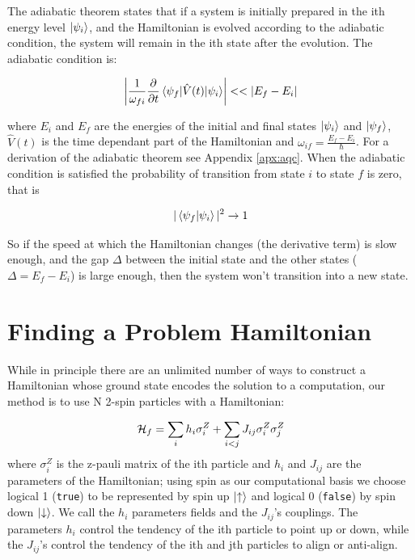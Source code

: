 The adiabatic theorem states that if a system is initially prepared in the ith energy level $\mathinner{|{\psi_i}\rangle}$, and the Hamiltonian is evolved according to the adiabatic condition, the system will remain in the ith state after the evolution.  The adiabatic condition is:

\begin{equation}
	\left | \frac{1}{\omega_{fi}}\frac{\partial}{\partial t} \mathinner{\langle{\psi_f | \hat{V}(t) | \psi_i}\rangle} \right | << |E_f - E_i|
\end{equation}

where $E_i$ and $E_f$ are the energies of the initial and final states $\mathinner{|{\psi_i}\rangle}$ and $\mathinner{|{\psi_f}\rangle}$, $\hat{V}(t)$ is the time dependant part of the Hamiltonian and $\omega_{if} = \frac{E_f - E_i}{\hbar}$.  For a derivation of the adiabatic theorem see Appendix \ref{apx:aqc}.\cite{zettili}  When the adiabatic condition is satisfied the probability of transition from state $i$ to state $f$ is zero, that is

\begin{equation}
	|\mathinner{\langle{\psi_f|\psi_i}\rangle}|^2 \rightarrow 1
\end{equation}

So if the speed at which the Hamiltonian changes (the derivative term) is slow enough, and the gap $\Delta$ between the initial state and the other states ($\Delta = E_f - E_i$) is large enough, then the system won't transition into a new state.  

\section{Finding a Problem Hamiltonian}
\label{sec:prob_ham}
While in principle there are an unlimited number of ways to construct a Hamiltonian whose ground state encodes the solution to a computation, our method is to use N 2-spin particles with a Hamiltonian:

\begin{equation}
	\label{eq:ham}
	\mathcal{H}_f = \sum_i h_i \sigma_i^Z + \sum_{i < j} J_{ij} \sigma_i^Z\sigma_j^Z 
\end{equation}
where $\sigma_i^Z$ is the z-pauli matrix of the ith particle and $h_i$ and $J_{ij}$ are the parameters of the Hamiltonian; using spin as our computational basis we choose logical 1 (\texttt{true}) to be represented by spin up $\mathinner{|{\uparrow}\rangle}$ and logical 0 (\texttt{false}) by spin down $\mathinner{|{\downarrow}\rangle}$.  We call the $h_i$ parameters fields and the $J_{ij}$'s couplings.  The parameters $h_i$ control the tendency of the ith particle to point up or down, while the $J_{ij}$'s control the tendency of the ith and jth particles to align or anti-align.


